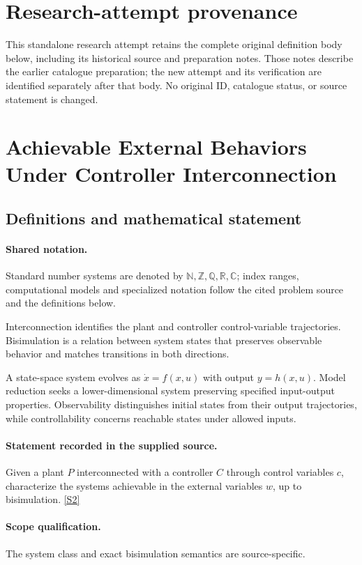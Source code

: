 \documentclass[11pt]{article}
\begin{document}
\section*{Research-attempt provenance}
This standalone research attempt retains the complete original definition body below,
including its historical source and preparation notes. Those notes describe the
earlier catalogue preparation; the new attempt and its verification are identified
separately after that body. No original ID, catalogue status, or source statement is changed.

\section{Achievable External Behaviors Under Controller Interconnection}\label{statement}

\subsection{Definitions and mathematical statement}

\paragraph{Shared notation.}Standard number systems are denoted by $\mathbb N,\mathbb Z,\mathbb Q,\mathbb R,\mathbb C$; index ranges, computational models and specialized notation follow the cited problem source and the definitions below.


Interconnection identifies the plant and controller control-variable trajectories. Bisimulation is a relation between system states that preserves observable behavior and matches transitions in both directions.

A state-space system evolves as $\dot x=f(x,u)$ with output $y=h(x,u)$. Model reduction seeks a lower-dimensional system preserving specified input-output properties. Observability distinguishes initial states from their output trajectories, while controllability concerns reachable states under allowed inputs.
\paragraph{Statement recorded in the supplied source.}
Given a plant $P$ interconnected with a controller $C$ through control variables $c$, characterize the systems achievable in the external variables $w$, up to bisimulation. \href{https://doi.org/10.4171/owr/2009/11}{[S2]}
\paragraph{Scope qualification.}
The system class and exact bisimulation semantics are source-specific.
\end{document}
